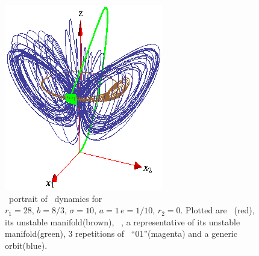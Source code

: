 \begin{figure}[ht]
\begin{center}
  \includegraphics[height=0.25\textheight]{../figs/CLE}
\end{center}
\caption[Complex Lorenz flow phase space]
{ \Statesp\ portrait of \CLe\ dynamics for $r_1=28,\, b=8/3,\,
\sigma=10,\, a=1\, e=1/10,\, r_2=0$. Plotted are \reqv\
(red), its unstable manifold(brown), \eqv\ , a
representative of its unstable manifold(green), 3 repetitions
of \rpo\ ``01''(magenta) and a generic orbit(blue).}
\label{fig:CLE}
\end{figure}

